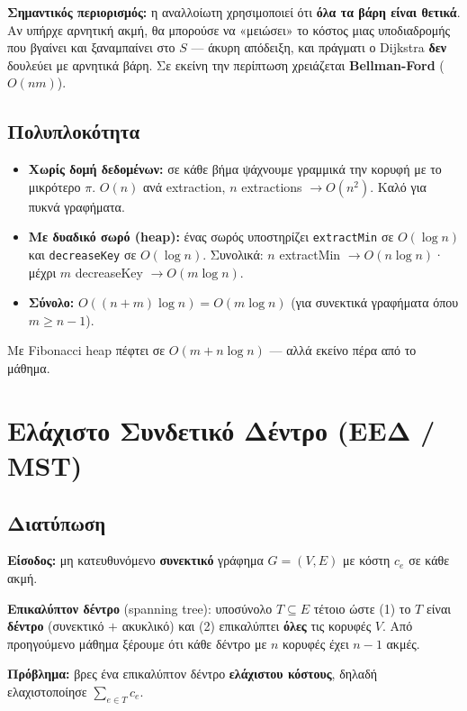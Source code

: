 \documentclass[11pt,a4paper]{article}
\begin{document}
\begin{warningbox}
\textbf{Σημαντικός περιορισμός:} η αναλλοίωτη χρησιμοποιεί ότι \textbf{όλα τα
βάρη είναι θετικά}. Αν υπήρχε αρνητική ακμή, θα μπορούσε να «μειώσει» το κόστος
μιας υποδιαδρομής που βγαίνει και ξαναμπαίνει στο $S$ --- άκυρη απόδειξη, και
πράγματι ο Dijkstra \textbf{δεν} δουλεύει με αρνητικά βάρη. Σε εκείνη την
περίπτωση χρειάζεται \textbf{Bellman-Ford} ($O(n m)$).
\end{warningbox}

\subsection{Πολυπλοκότητα}

\begin{itemize}
  \item \textbf{Χωρίς δομή δεδομένων:} σε κάθε βήμα ψάχνουμε γραμμικά την κορυφή
  με το μικρότερο $\pi$. $O(n)$ ανά extraction, $n$ extractions $\to O(n^2)$.
  Καλό για πυκνά γραφήματα.
  \item \textbf{Με δυαδικό σωρό (heap):} ένας σωρός υποστηρίζει \texttt{extractMin}
  σε $O(\log n)$ και \texttt{decreaseKey} σε $O(\log n)$. Συνολικά: $n$
  extractMin $\to O(n \log n)$· μέχρι $m$ decreaseKey $\to O(m \log n)$.
  \item \textbf{Σύνολο:} $O((n + m) \log n) = O(m \log n)$ (για συνεκτικά
  γραφήματα όπου $m \ge n - 1$).
\end{itemize}
Με Fibonacci heap πέφτει σε $O(m + n \log n)$ --- αλλά εκείνο πέρα από το μάθημα.

\section{Ελάχιστο Συνδετικό Δέντρο (ΕΕΔ / MST)}

\subsection{Διατύπωση}

\textbf{Είσοδος:} μη κατευθυνόμενο \textbf{συνεκτικό} γράφημα $G = (V, E)$ με
κόστη $c_e$ σε κάθε ακμή.

\textbf{Επικαλύπτον δέντρο} (spanning tree): υποσύνολο $T \subseteq E$ τέτοιο
ώστε (1) το $T$ είναι \textbf{δέντρο} (συνεκτικό $+$ ακυκλικό) και (2)
επικαλύπτει \textbf{όλες} τις κορυφές $V$. Από προηγούμενο μάθημα ξέρουμε ότι
κάθε δέντρο με $n$ κορυφές έχει $n - 1$ ακμές.

\textbf{Πρόβλημα:} βρες ένα επικαλύπτον δέντρο \textbf{ελάχιστου κόστους},
δηλαδή ελαχιστοποίησε $\sum_{e \in T} c_e$.
\end{document}
